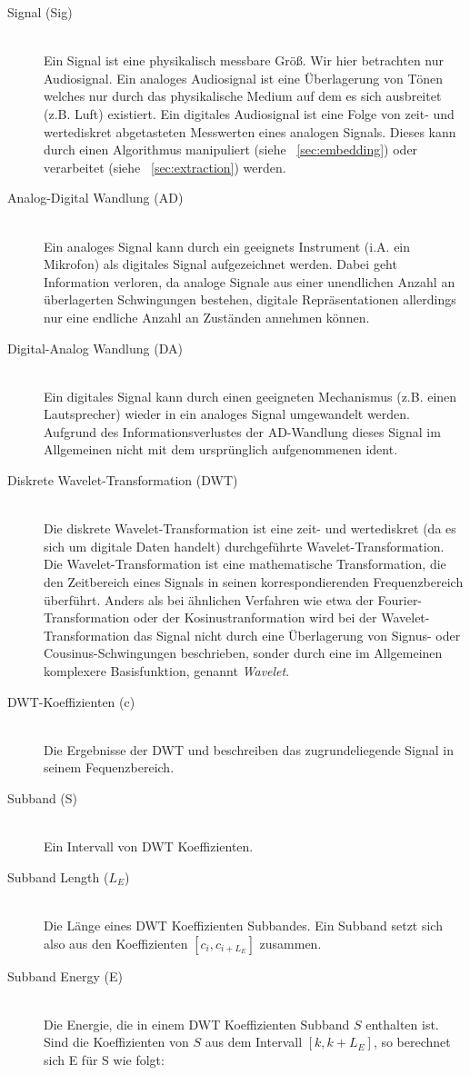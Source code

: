 \begin{description}
	\item[Signal (Sig)] \hfill \\
	Ein Signal ist eine physikalisch messbare Gr\"o{\ss}. Wir hier betrachten  nur Audiosignal. Ein analoges Audiosignal ist eine \"Uberlagerung von T\"onen welches nur durch das physikalische Medium auf dem es sich ausbreitet (z.B. Luft) existiert. Ein digitales Audiosignal ist eine Folge von zeit- und wertediskret abgetasteten Messwerten eines analogen Signals. Dieses kann durch einen Algorithmus manipuliert (siehe ~\ref{sec:embedding}) oder verarbeitet (siehe ~\ref{sec:extraction}) werden.
  	\item[Analog-Digital Wandlung (AD)] \hfill \\ 
  	 Ein analoges Signal kann durch ein geeignets Instrument (i.A. ein Mikrofon) als digitales Signal aufgezeichnet werden. Dabei geht Information verloren, da analoge Signale aus einer unendlichen Anzahl an \"uberlagerten Schwingungen bestehen, digitale Repr\"asentationen allerdings nur eine endliche Anzahl an Zust\"anden annehmen k\"onnen. 
 	\item[Digital-Analog Wandlung (DA)] \hfill \\ 
 	 Ein digitales Signal kann durch einen geeigneten Mechanismus (z.B. einen Lautsprecher) wieder in ein analoges Signal umgewandelt werden. Aufgrund des Informationsverlustes der AD-Wandlung dieses Signal im Allgemeinen nicht mit dem urspr\"unglich aufgenommenen ident. 
	 \item[Diskrete Wavelet-Transformation (DWT)] \hfill \\ 
	 Die diskrete Wavelet-Transformation ist eine zeit- und wertediskret (da es sich um digitale Daten handelt) durchgef\"uhrte Wavelet-\-Trans\-formation. Die Wavelet-Transformation ist eine mathematische Transformation, die den Zeitbereich eines Signals in seinen korrespondierenden Frequenzbereich \"uberf\"uhrt. Anders als bei \"ahnlichen Verfahren wie etwa der Fourier-\-Transformation oder der Kosinus\-tranformation wird bei der Wavelet-Transformation das Signal nicht durch eine Überlagerung von Signus- oder Cousinus-Schwingungen beschrieben, sonder durch eine im Allgemeinen komplexere Basisfunktion, genannt \textit{Wavelet}.	 
 	\item[DWT-Koeffizienten (c)] \hfill \\
	Die Ergebnisse der DWT und beschreiben das zugrundeliegende Signal in seinem Fequenzbereich. 
	\item[Subband (S)] \hfill \\ 
	Ein Intervall von DWT Koeffizienten. 
	\item[Subband Length (${L}_{E}$)] \hfill \\
	Die L\"ange eines DWT Koeffizienten Subbandes. Ein Subband setzt sich also aus den Koeffizienten $[{c}_{i},{c}_{i+{L}_{E}}]$ zusammen. 
	\item[Subband Energy (E)] \hfill \\
	Die Energie, die in einem DWT Koeffizienten Subband $S$ enthalten ist. Sind die Koeffizienten von $S$ aus dem Intervall $[k, k+{L}_{E}]$, so berechnet sich E f\"ur S wie folgt:
	

\end{description}
